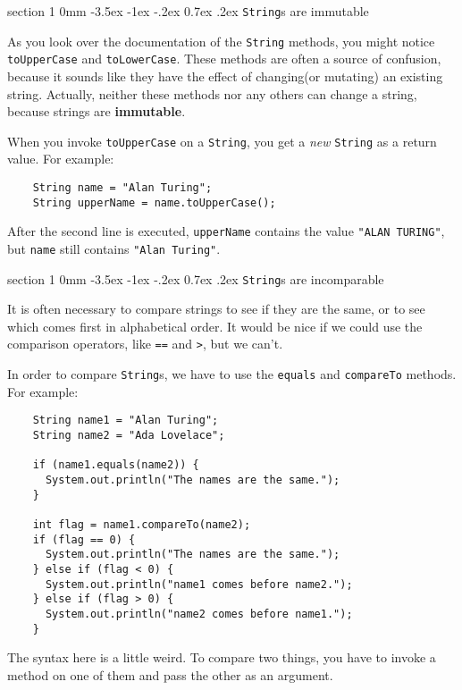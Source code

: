 \documentclass{book}
\makeatletter
\renewcommand{\section}{\@startsection 
    {section} {1} {0mm}%
    {-3.5ex \@plus -1ex \@minus -.2ex}%
    {0.7ex \@plus.2ex}%
    {\normalfont\Large\bfseries}}
\makeatother
\begin{document}


\section{{\tt String}s are immutable}
\label{immutable}

As you look over the documentation of the {\tt String} methods, you
might notice {\tt toUpperCase} and {\tt toLowerCase}.  These
methods are often a source of confusion, because it sounds
like they have the effect of changing(or mutating) an
existing string.  Actually, neither these methods nor any
others can change a string, because strings are {\bf immutable}.

When you invoke {\tt toUpperCase} on a {\tt String}, you get a
{\em new} {\tt String} as a return value.  For example:

\begin{verbatim}
    String name = "Alan Turing";
    String upperName = name.toUpperCase();
\end{verbatim}
%
After the second line is executed, {\tt upperName} contains
the value {\tt "ALAN TURING"}, but {\tt name} still contains
{\tt "Alan Turing"}.


\section{{\tt String}s are incomparable}
\label{incomparable}

It is often necessary to compare strings to see if they are the same,
or to see which comes first in alphabetical order.  It would be
nice if we could use the comparison operators, like {\tt ==} and
{\tt >}, but we can't.

In order to compare {\tt String}s, we have to use the {\tt equals}
and {\tt compareTo} methods.  For example:

\begin{verbatim}
    String name1 = "Alan Turing";
    String name2 = "Ada Lovelace";

    if (name1.equals(name2)) {
      System.out.println("The names are the same.");
    }

    int flag = name1.compareTo(name2);
    if (flag == 0) {
      System.out.println("The names are the same.");
    } else if (flag < 0) {
      System.out.println("name1 comes before name2.");
    } else if (flag > 0) {
      System.out.println("name2 comes before name1.");
    }
\end{verbatim}
%
The syntax here is a little weird.  To compare two things, you
have to invoke a method on one of them and pass the other
as an argument.
\end{document}
